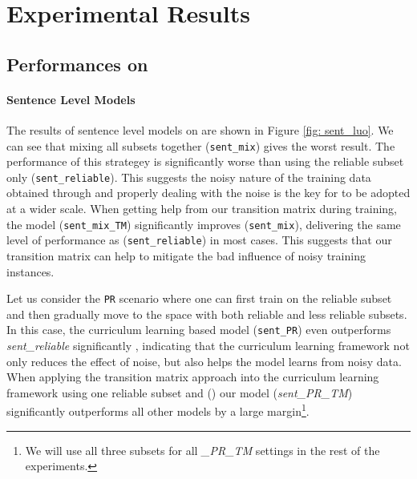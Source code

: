 \section{Experimental Results \label{sec:evaluation}}

\subsection{Performances on \TimeRE}
\paragraph{Sentence Level Models}
The results of sentence level models on \TimeRE are shown in Figure \ref{fig:
sent_luo}. We can see that mixing all subsets together (\texttt{sent\_mix})
gives the worst result. The performance of this strategey is significantly
worse than using the reliable subset only (\texttt{sent\_reliable}). This
suggests the noisy nature of the training data obtained through \DS and
properly dealing with the noise is the key for \DS to be adopted at a wider
scale. When getting help from our transition matrix during training, the
model (\texttt{sent\_mix\_TM}) significantly improves (\texttt{sent\_mix}),
delivering the same level of performance as (\texttt{sent\_reliable}) in most
cases. This suggests that our transition matrix can help to mitigate the bad influence of noisy training instances.


Let us consider the \texttt{PR} scenario where one can first train on the
reliable subset and then gradually move to the space with both reliable and  less
reliable subsets. In this case, the curriculum learning based model
(\texttt{sent\_PR}) even  outperforms \emph{sent\_reliable} significantly  ,
indicating that the curriculum learning framework not only reduces the effect
of noise, but also helps the model learns from noisy data. When applying the
transition matrix approach into the curriculum learning framework using one reliable
subset and 
()
our model (\emph{sent\_PR\_TM}) significantly outperforms all
other models by a large margin\footnote{We will use all three subsets for all
\emph{\_PR\_TM} settings in the rest of the experiments.}. 


